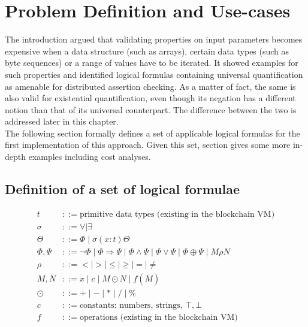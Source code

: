\chapter{Problem Definition and Use-cases}\label{chap:use_cases}
The introduction argued that validating properties on input parameters becomes expensive when a data structure (such as arrays), certain data types (such as byte sequences) or a range of values have to be iterated. It showed examples for such properties and identified logical formulas containing universal quantification as amenable for distributed assertion checking. As a matter of fact, the same is also valid for existential quantification, even though its negation has a different notion than that of its universal counterpart. The difference between the two is addressed later in this chapter. \\
The following section formally defines a set of applicable logical formulas for the first implementation of this approach. Given this set, section  gives some more in-depth examples including cost analyses. 

\section{Definition of a set of logical formulae}\label{sec:formulae}
\begin{align*}
    t &::= \text{primitive data types (existing in the blockchain VM)} \\
    \sigma &::= \forall \mid \exists \\
    \Theta &::= \Phi \mid \sigma (x:t) \Theta \\
    \Phi,\Psi &::= \neg\Phi \mid \Phi \Rightarrow \Psi \mid \Phi\wedge\Psi \mid
    				\Phi\vee\Psi \mid \Phi \oplus \Psi \mid M \rho N \\
    \rho &::= < \mid > \mid \le \mid \ge \mid = \mid \ne \\
    M, N &::= x \mid c \mid M \odot N  \mid f (\overline M) \\
    \odot &::= +\mid -\mid * \mid / \mid \% \\
    c &::= \text{constants: numbers, strings, } \top, \bot \\
    f &::= \text{operations (existing in the blockchain VM)}
\end{align*}
\begingroup\vspace*{-\baselineskip}
\vspace*{\baselineskip}\endgroup

